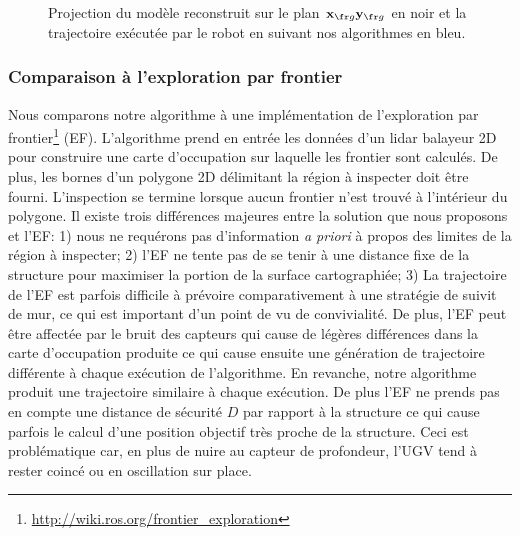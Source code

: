 \begin{figure}[p]
{  	\label{subfig:large gamma husky 4.5}
  }
  \hfil
  \caption{
  Projection du modèle reconstruit sur le plan $\vect{x}_{\fr g}\vect{y}_{\fr g}$ en noir et la trajectoire exécutée par le robot en suivant nos algorithmes en bleu.
  }
  \label{fig:relative size}
\end{figure}

\subsubsection{Comparaison à l'exploration par frontier}

Nous comparons notre algorithme à une implémentation de l'exploration par frontier\footnote{\url{http://wiki.ros.org/frontier_exploration}} (EF). L'algorithme prend en entrée les données d'un lidar balayeur 2D pour construire une carte d'occupation sur laquelle les frontier sont calculés. De plus, les bornes d'un polygone 2D délimitant la région à inspecter doit être fourni. L'inspection se termine lorsque aucun frontier n'est trouvé à l'intérieur du polygone. Il existe trois différences majeures entre la solution que nous proposons et l'EF: 1) nous ne requérons pas d'information \textit{a priori} à propos des limites de la région à inspecter; 2) l'EF ne tente pas de se tenir à une distance fixe de la structure pour maximiser la portion de la surface cartographiée; 3) La trajectoire de l'EF est parfois difficile à prévoire comparativement à une stratégie de suivit de mur, ce qui est important d'un point de vu de convivialité. De plus, l'EF peut être affectée par le bruit des capteurs qui cause de légères différences dans la carte d'occupation produite ce qui cause ensuite une génération de trajectoire différente à chaque exécution de l'algorithme. En revanche, notre algorithme produit une trajectoire similaire à chaque exécution. De plus l'EF ne prends pas en compte une distance de sécurité $D$ par rapport à la structure ce qui cause parfois le calcul d'une position objectif très proche de la structure. Ceci est problématique car, en plus de nuire au capteur de profondeur, l'UGV tend à rester coincé ou en oscillation sur place.

